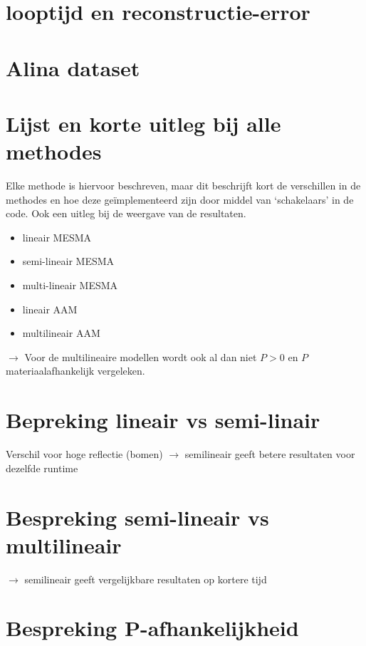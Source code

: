 \documentclass[12pt]{report}
\begin{document}
\section{looptijd en reconstructie-error}

\section{Alina dataset}

\section{Lijst en korte uitleg bij alle methodes}

Elke methode is hiervoor beschreven, maar dit beschrijft kort de verschillen in de methodes en hoe deze ge\"implementeerd zijn door middel van `schakelaars' in de code. Ook een uitleg bij de weergave van de resultaten. 

\begin{itemize}
\item lineair MESMA
\item semi-lineair MESMA
\item multi-lineair MESMA
\item lineair AAM
\item multilineair AAM
\end{itemize}

$\rightarrow$ Voor de multilineaire modellen wordt ook al dan niet $P> 0$ en $P$ materiaalafhankelijk vergeleken.



\section{Bepreking lineair vs semi-linair}

Verschil voor hoge reflectie (bomen)
$\rightarrow$ semilineair geeft betere resultaten voor dezelfde runtime

\section{Bespreking semi-lineair vs multilineair}

$\rightarrow$ semilineair geeft vergelijkbare resultaten op kortere tijd

\section{Bespreking P-afhankelijkheid}
\end{document}
